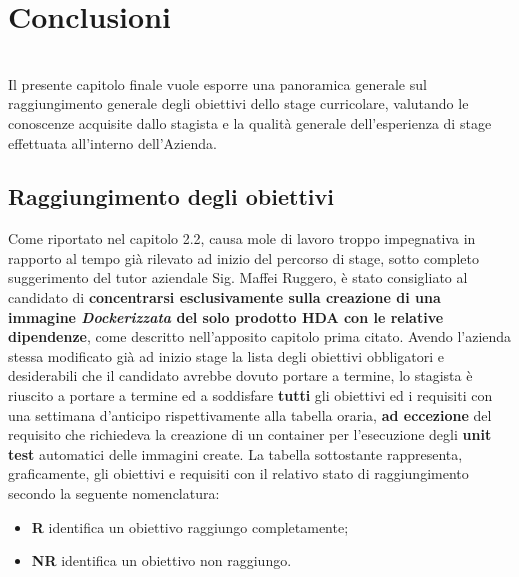 
\chapter{Conclusioni}
\label{cap:conclusioni}
\\
Il presente capitolo finale vuole esporre una panoramica generale sul raggiungimento generale degli obiettivi dello stage curricolare, valutando le conoscenze acquisite dallo stagista e la qualità generale dell'esperienza di stage effettuata all'interno dell'Azienda.
\section{Raggiungimento degli obiettivi}
Come riportato nel capitolo 2.2, causa mole di lavoro troppo impegnativa in rapporto al tempo già rilevato ad inizio del percorso di stage, sotto completo suggerimento del tutor aziendale Sig. Maffei Ruggero, è stato consigliato al candidato di \textbf{concentrarsi esclusivamente sulla creazione di una immagine \textit{Dockerizzata} del solo prodotto HDA con le relative dipendenze}, come descritto nell'apposito capitolo prima citato.
Avendo l'azienda stessa modificato già ad inizio stage la lista degli obiettivi obbligatori e desiderabili che il candidato avrebbe dovuto portare a termine, lo stagista è riuscito a portare a termine ed a soddisfare \textbf{tutti} gli obiettivi ed i requisiti con una settimana d'anticipo rispettivamente alla tabella oraria, \textbf{ad eccezione} del requisito che richiedeva la creazione di un container per l'esecuzione degli \textbf{unit test} automatici delle immagini create. La tabella sottostante rappresenta, graficamente, gli obiettivi e requisiti con il relativo stato di raggiungimento secondo la seguente nomenclatura:
\begin{itemize}
	\item \textbf{R} identifica un obiettivo raggiungo completamente;
	\item \textbf{NR} identifica un obiettivo non raggiungo.
\end{itemize}
\newpage
